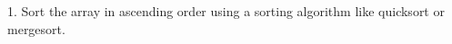 \documentclass[preview]{standalone}
\begin{document}
1. Sort the array in ascending order using a sorting algorithm like quicksort or mergesort.\\
\end{document}
